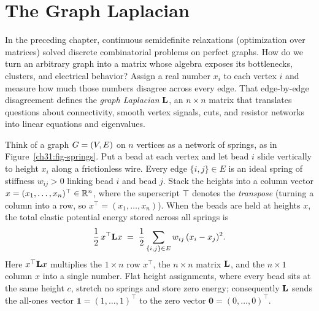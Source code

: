 \chapter{The Graph Laplacian}

In the preceding chapter, continuous semidefinite relaxations (optimization over matrices) solved discrete combinatorial problems on perfect graphs. How do we turn an arbitrary graph into a matrix whose algebra exposes its bottlenecks, clusters, and electrical behavior? Assign a real number $x_i$ to each vertex $i$ and measure how much those numbers disagree across every edge. That edge-by-edge disagreement defines the \emph{graph Laplacian} $\mathbf{L}$, an $n\times n$ matrix that translates questions about connectivity, smooth vertex signals, cuts, and resistor networks into linear equations and eigenvalues.

\begin{intuitionbox}
Think of a graph $G=(V,E)$ on $n$ vertices as a network of springs, as in Figure~\ref{ch31:fig-springs}. Put a bead at each vertex and let bead $i$ slide vertically to height $x_i$ along a frictionless wire. Every edge $\{i,j\}\in E$ is an ideal spring of stiffness $w_{ij} > 0$ linking bead $i$ and bead $j$. Stack the heights into a column vector $x = (x_1,\dots,x_n)^\top \in \mathbb{R}^n$, where the superscript $\top$ denotes the \emph{transpose} (turning a column into a row, so $x^\top = (x_1,\dots,x_n)$). When the beads are held at heights $x$, the total elastic potential energy stored across all springs is
\[
  \frac{1}{2}\, x^\top \mathbf{L} x \;=\; \frac{1}{2} \sum_{\{i,j\}\in E} w_{ij}\,(x_i - x_j)^2 .
\]
Here $x^\top \mathbf{L} x$ multiplies the $1\times n$ row $x^\top$, the $n\times n$ matrix $\mathbf{L}$, and the $n\times 1$ column $x$ into a single number. Flat height assignments, where every bead sits at the same height $c$, stretch no springs and store zero energy; consequently $\mathbf{L}$ sends the all-ones vector $\mathbf{1} = (1,\dots,1)^\top$ to the zero vector $\mathbf{0} = (0,\dots,0)^\top$.
\end{intuitionbox}

